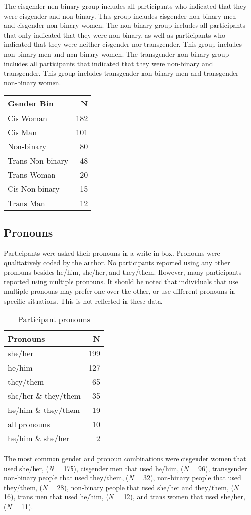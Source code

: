 \documentclass[12pt,twoside]{reedthesis}
\begin{document}
The cisgender non-binary group includes all participants who indicated that they were cisgender and non-binary. This group includes cisgender non-binary men and cisgender non-binary women. The non-binary group includes all participants that only indicated that they were non-binary, as well as participants who indicated that they were neither cisgender nor transgender. This group includes non-binary men and non-binary women. The transgender non-binary group includes all participants that indicated that they were non-binary and transgender. This group includes transgender non-binary men and transgender non-binary women.
\begin{tabular}{l|r}
\hline
Gender Bin & N\\
\hline
Cis Woman & 182\\
\hline
Cis Man & 101\\
\hline
Non-binary & 80\\
\hline
Trans Non-binary & 48\\
\hline
Trans Woman & 20\\
\hline
Cis Non-binary & 15\\
\hline
Trans Man & 12\\
\hline
\end{tabular}
\hypertarget{pronouns}{%
\subsection{Pronouns}\label{pronouns}}

Participants were asked their pronouns in a write-in box. Pronouns were qualitatively coded by the author. No participants reported using any other pronouns besides he/him, she/her, and they/them. However, many participants reported using multiple pronouns. It should be noted that individuals that use multiple pronouns may prefer one over the other, or use different pronouns in specific situations. This is not reflected in these data.
\begin{table}

\caption{\label{tab:unnamed-chunk-4}Participant pronouns}
\centering
\begin{tabular}[t]{l|r}
\hline
Pronouns & N\\
\hline
she/her & 199\\
\hline
he/him & 127\\
\hline
they/them & 65\\
\hline
she/her \& they/them & 35\\
\hline
he/him \& they/them & 19\\
\hline
all pronouns & 10\\
\hline
he/him \& she/her & 2\\
\hline
\end{tabular}
\end{table}
The most common gender and pronoun combinations were cisgender women that used she/her, (\emph{N} = 175), cisgender men that used he/him, (\emph{N} = 96), transgender non-binary people that used they/them, (\emph{N} = 32), non-binary people that used they/them, (\emph{N} = 28), non-binary people that used she/her and they/them, (\emph{N} = 16), trans men that used he/him, (\emph{N} = 12), and trans women that used she/her, (\emph{N} = 11).
\end{document}
